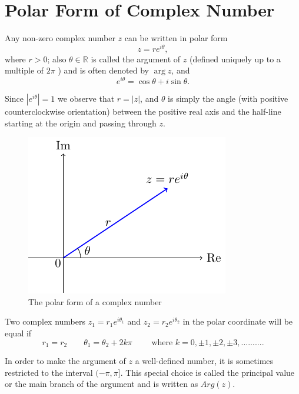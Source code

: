 \section{Polar Form of Complex Number}
Any non-zero complex number $z$ can be written in polar form
$$
z=r e^{i \theta},
$$
where $r>0$; also $\theta \in \mathbb{R}$ is called the argument of $z$ (defined uniquely up to a multiple of $2 \pi$ ) and is often denoted by $\arg z$, and
$$
\displaystyle e^{i \theta}=\cos \theta+i \sin \theta .
$$

\noindent Since $\left|e^{i \theta}\right|=1$ we observe that $r=|z|$, and $\theta$ is simply the angle (with positive counterclockwise orientation) between the positive real axis and the half-line starting at the origin and passing through $z$.
\begin{figure}[ht!]
    \centering
    \includegraphics{FIG_MAT215/FIG3.pdf}
    \caption{The polar form of a complex number}
    \label{fig3}
\end{figure}
\FloatBarrier
\begin{theorem}
    Two complex numbers $z_1=r_1e^{i\theta_1}$ and $z_2=r_2e^{i\theta_2}$ in the polar coordinate will be equal if $$r_1=r_2 \quad \quad \theta_1=\theta_2+2k\pi \quad \quad \text{ where } k=0,\pm 1, \pm 2, \pm 3, ..........$$ 
\end{theorem}
\begin{defn}
    In order to make the argument of $z$ a well-defined number, it is sometimes restricted to the interval $(-\pi,\pi]$. This special choice is called the principal value or the main branch of the argument and is written as 
$Arg(z)$.
\end{defn}
